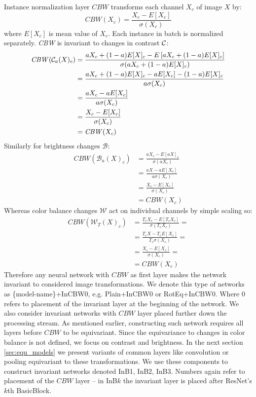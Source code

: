 Instance normalization layer $\mathit{CBW}$ transforms each channel
$X_c$ of image $X$ by:
$$ \mathit{CBW}(X_c) = \frac{X_c-E[X_c]}{\sigma(X_c)} $$
where $E[X_c]$ is mean value of $X_c$.
Each instance in batch is normalized separately.
\textit{CBW} is invariant to changes in contrast $\mathcal{C}$:
\begin{align*}
    \mathit{CBW}(\mathcal{C}_a(X)_c) &=
    \frac{aX_c+(1-a)E[X]_c - E\left[aX_c+(1-a)E[X]_c\right]}{\sigma(aX_c+(1-a)E[X]_c)} \\
    &= \frac{aX_c+(1-a)E[X]_c - aE[X_c]-(1-a)E[X]_c}{a\sigma(X_c)} \\
    &= \frac{aX_c-aE[X_c]}{a\sigma(X_c)} \\
    &= \frac{X_c-E[X_c]}{\sigma(X_c)} \\
    &= \mathit{CBW}(X_c)
\end{align*}
Similarly for brightness changes $\mathcal{B}$:
\begin{align*}
    \mathit{CBW}(\mathcal{B}_a(X)_c) &=
    \frac{aX_c - E\left[aX\right]_c}{\sigma(aX_c)} \\
    &= \frac{aX-aE[X_c]}{a\sigma(X_c)} \\
    &= \frac{X_c-E[X_c]}{\sigma(X_c)} \\
    &= \mathit{CBW}(X_c)
\end{align*}
Whereas color balance changes $\mathcal{W}$ act on individual channels by simple
scaling so:
\begin{align*}
    \mathit{CBW}(\mathcal{W}_T(X)_c) &=
    \frac{T_cX_c - E\left[T_cX_c\right]}{\sigma(T_cX_c)} = \\
    &= \frac{T_cX-T_cE[X_c]}{T_c\sigma(X_c)} = \\
    &= \frac{X_c-E[X_c]}{\sigma(X_c)} = \\
    &= \mathit{CBW}(X_c)
\end{align*}
Therefore any neural network with $\mathit{CBW}$ as first layer
makes the network invariant to considered image transformations.
We denote this type of networks as \{model-name\}+InCBW0, e.g. Plain+InCBW0 or
RotEq+InCBW0. Where 0 refers to placement of the invariant layer at the
beginning of the network. We also consider invariant networks with $\mathit{CBW}$
layer placed further down the processing stream. As mentioned earlier,
constructing such network requires all layers before $\mathit{CBW}$ to be
equivariant. Since the equivariance to changes in color balance is not defined,
we focus on contrast and brightness. In the next section \ref{sec:equ_models} we
present variants of common layers like convolution or pooling equivariant to
these transformations. We use these components to construct invariant networks
denoted InB1, InB2, InB3. Numbers again refer to
placement of the $\mathit{CBW}$ layer -- in InB$k$ the invariant layer is placed
after ResNet's $k$th BasicBlock.

